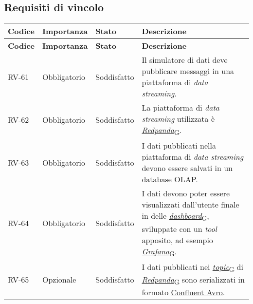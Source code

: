 \newpage
\subsection{Requisiti di vincolo}
\begin{longtable}{|>{\centering\arraybackslash}m{}|>{\centering\arraybackslash}m{}|>{\centering\arraybackslash}m{}|>{\centering\arraybackslash}m{}|}
	\hline
	\textbf{Codice} & \textbf{Importanza} & \textbf{Stato}& \textbf{Descrizione}\\\hline
	\endfirsthead
	\hline
	\textbf{Codice} & \textbf{Importanza} & \textbf{Stato}& \textbf{Descrizione}\\\hline
	\endhead
	\hline
	RV-61           & Obbligatorio        & Soddisfatto & Il simulatore di dati deve pubblicare messaggi in una piattaforma di \textit{data streaming}.
	\\\hline
	RV-62           & Obbligatorio        & Soddisfatto                                                                                                           & La piattaforma di \textit{data streaming} utilizzata è \href{https://7last.github.io/docs/pb/documentazione-interna/glossario\#redpanda}{\textit{Redpanda}\textsubscript{G}}.
	\\\hline
	RV-63           & Obbligatorio        & Soddisfatto & I dati pubblicati nella piattaforma di \textit{data streaming} devono essere salvati in un database OLAP.
	\\\hline
	RV-64           & Obbligatorio        & Soddisfatto & I dati devono poter essere visualizzati dall'utente finale in delle \href{https://7last.github.io/docs/pb/documentazione-interna/glossario\#dashboard}{\textit{dashboard}\textsubscript{G}}, sviluppate con un \textit{tool} apposito, ad esempio \href{https://7last.github.io/docs/pb/documentazione-interna/glossario\#grafana}{\textit{Grafana}\textsubscript{G}}.
	\\\hline
	RV-65           & Opzionale           & Soddisfatto                                                                                                           & I dati pubblicati nei \href{https://7last.github.io/docs/pb/documentazione-interna/glossario\#topic}{\textit{topic}\textsubscript{G}} di \href{https://7last.github.io/docs/pb/documentazione-interna/glossario\#redpanda}{\textit{Redpanda}\textsubscript{G}} sono serializzati in formato \href{https://docs.confluent.io/platform/current/schema-registry/fundamentals/serdes-develop/serdes-avro.html}{\underline{Confluent Avro}}.

\end{longtable}
